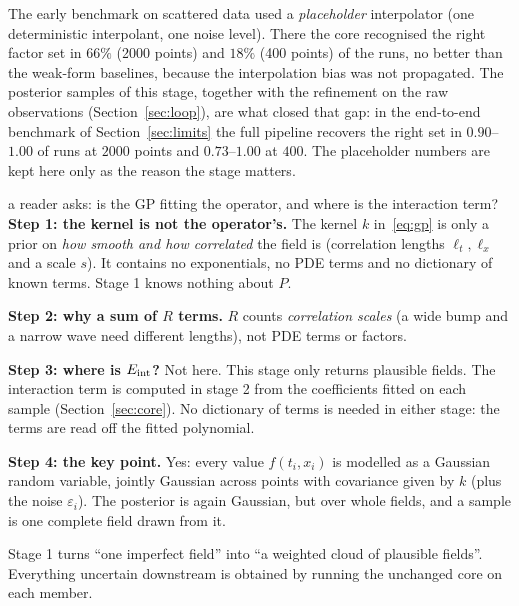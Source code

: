 \begin{caution}[title=Why this stage decides the result]
The early benchmark on scattered data used a \emph{placeholder} interpolator (one deterministic interpolant, one noise level). There the core recognised the right factor set in $66\%$ (2000 points) and $18\%$ (400 points) of the runs, no better than the weak-form baselines, because the interpolation bias was not propagated. The posterior samples of this stage, together with the refinement on the raw observations (Section~\ref{sec:loop}), are what closed that gap: in the end-to-end benchmark of Section~\ref{sec:limits} the full pipeline recovers the right set in $0.90$--$1.00$ of runs at $2000$ points and $0.73$--$1.00$ at $400$. The placeholder numbers are kept here only as the reason the stage matters.
\end{caution}

\begin{explained}{a reader asks: is the GP fitting the operator, and where is the interaction term?}
\textbf{Step 1: the kernel is not the operator's.} The kernel $k$ in~\eqref{eq:gp} is only a prior on \emph{how smooth and how correlated} the field is (correlation lengths $\ell_t,\ell_x$ and a scale $s$). It contains no exponentials, no PDE terms and no dictionary of known terms. Stage 1 knows nothing about $P$.

\medskip\textbf{Step 2: why a sum of $R$ terms.} $R$ counts \emph{correlation scales} (a wide bump and a narrow wave need different lengths), not PDE terms or factors.

\medskip\textbf{Step 3: where is $E_{\mathrm{int}}$?} Not here. This stage only returns plausible fields. The interaction term is computed in stage 2 from the coefficients fitted on each sample (Section~\ref{sec:core}). No dictionary of terms is needed in either stage: the terms are read off the fitted polynomial.

\medskip\textbf{Step 4: the key point.} Yes: every value $f(t_i,x_i)$ is modelled as a Gaussian random variable, jointly Gaussian across points with covariance given by $k$ (plus the noise $\varepsilon_i$). The posterior is again Gaussian, but over whole fields, and a sample is one complete field drawn from it.
\end{explained}

\begin{takeaway}
Stage 1 turns ``one imperfect field'' into ``a weighted cloud of plausible fields''. Everything uncertain downstream is obtained by running the unchanged core on each member.
\end{takeaway}
